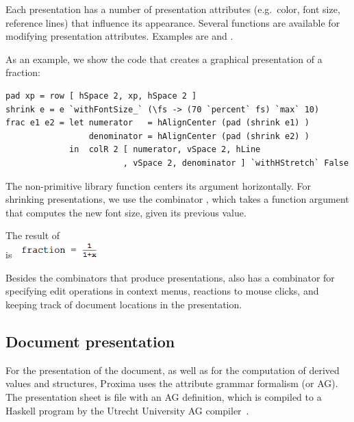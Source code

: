 \documentclass[12pt]{article}
\begin{document}
Each presentation has a number of presentation attributes (e.g.\ color, font size, reference lines) that influence its appearance. Several functions are available for modifying presentation attributes. Examples are  and . 


As an example, we show the \Xprez code that creates a graphical presentation of a fraction:

\begin{footnotesize}
\begin{verbatim}
pad xp = row [ hSpace 2, xp, hSpace 2 ]
shrink e = e `withFontSize_` (\fs -> (70 `percent` fs) `max` 10)
frac e1 e2 = let numerator   = hAlignCenter (pad (shrink e1) )
                 denominator = hAlignCenter (pad (shrink e2) )
             in  colR 2 [ numerator, vSpace 2, hLine
                        , vSpace 2, denominator ] `withHStretch` False
\end{verbatim}
\end{footnotesize}

The non-primitive library function  centers its argument horizontally. For shrinking presentations, we use the combinator , which takes a function argument that computes the new font size, given its previous value.

The result of \\ 
is~~\includegraphics[width=3cm]{images/fracExample}

Besides the combinators that produce presentations, \Xprez also has a combinator for specifying edit operations in context menus, reactions to mouse clicks, and keeping track of document locations in the presentation. 


\subsection{Document presentation}

For the presentation of the document, as well as for the computation of derived values and structures, Proxima uses the attribute grammar formalism (or AG). The presentation sheet is file with an AG definition, which is compiled to a Haskell program by the Utrecht University AG compiler~\cite{swierstra08ag}.
\end{document}
